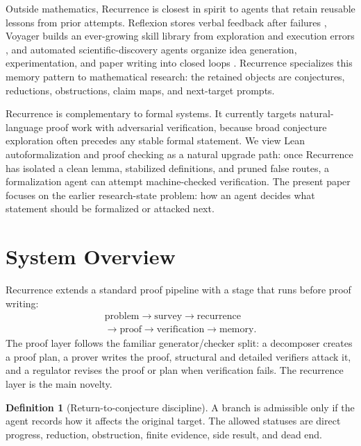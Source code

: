 \documentclass{article}
\theoremstyle{definition}
\newtheorem{definition}{Definition}
\theoremstyle{remark}
\begin{document}
Outside mathematics, Recurrence is closest in spirit to agents that retain reusable lessons from prior attempts. Reflexion stores verbal feedback after failures \citep{shinn2023reflexion}, Voyager builds an ever-growing skill library from exploration and execution errors \citep{wang2023voyager}, and automated scientific-discovery agents organize idea generation, experimentation, and paper writing into closed loops \citep{lu2024aiscientist}. Recurrence specializes this memory pattern to mathematical research: the retained objects are conjectures, reductions, obstructions, claim maps, and next-target prompts.

Recurrence is complementary to formal systems. It currently targets natural-language proof work with adversarial verification, because broad conjecture exploration often precedes any stable formal statement. We view Lean autoformalization and proof checking as a natural upgrade path: once Recurrence has isolated a clean lemma, stabilized definitions, and pruned false routes, a formalization agent can attempt machine-checked verification. The present paper focuses on the earlier research-state problem: how an agent decides what statement should be formalized or attacked next.

\section{System Overview}

Recurrence extends a standard proof pipeline with a stage that runs before proof writing:
\[
\begin{gathered}
\text{problem} \to \text{survey} \to \text{recurrence} \\
\to \text{proof} \to \text{verification} \to \text{memory}.
\end{gathered}
\]
The proof layer follows the familiar generator/checker split: a decomposer creates a proof plan, a prover writes the proof, structural and detailed verifiers attack it, and a regulator revises the proof or plan when verification fails. The recurrence layer is the main novelty.

\begin{definition}[Return-to-conjecture discipline]
A branch is admissible only if the agent records how it affects the original target. The allowed statuses are direct progress, reduction, obstruction, finite evidence, side result, and dead end.
\end{definition}
\end{document}
